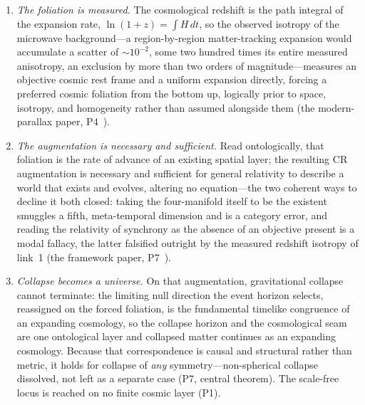 \documentclass[11pt,a4paper]{article}
\theoremstyle{plain}
\theoremstyle{definition}
\theoremstyle{remark}
\begin{document}
\begin{enumerate}
\item \emph{The foliation is measured.} The cosmological redshift is the path integral of the
expansion rate, $\ln(1+z)=\int H\,dt$, so the observed isotropy of the microwave
background---a region-by-region matter-tracking expansion would accumulate a scatter of $\sim\!10^{-2}$,
some two hundred times its entire measured anisotropy, an exclusion by more than two orders of
magnitude---measures
an objective cosmic rest frame and a uniform expansion directly, forcing a preferred cosmic
foliation from the bottom up, logically prior to space, isotropy, and homogeneity rather than
assumed alongside them (the modern-parallax paper, P4~\cite{JanzenModernParallax}).

\item \emph{The augmentation is necessary and sufficient.} Read ontologically, that foliation
is the rate of advance of an existing spatial layer; the resulting CR augmentation is
necessary and sufficient for general relativity to describe a world that exists and evolves,
altering no equation---the two coherent ways to decline it both closed: taking the four-manifold
itself to be the existent smuggles a fifth, meta-temporal dimension and is a category error, and
reading the relativity of synchrony as the absence of an objective present is a modal fallacy,
the latter falsified outright by the measured redshift isotropy of link~1 (the framework paper, P7~\cite{JanzenCRframework}).

\item \emph{Collapse becomes a universe.} On that augmentation, gravitational collapse cannot
terminate: the limiting null direction the event horizon selects, reassigned on the forced
foliation, is the fundamental timelike congruence of an expanding cosmology, so the collapse
horizon and the cosmological seam are one ontological layer and collapsed matter continues as an
expanding cosmology. Because that correspondence is causal and structural rather than metric, it
holds for collapse of \emph{any} symmetry---non-spherical collapse dissolved, not left as a
separate case (P7, central theorem). The scale-free locus is reached on no finite cosmic
layer (P1).


\end{enumerate}
\end{document}
